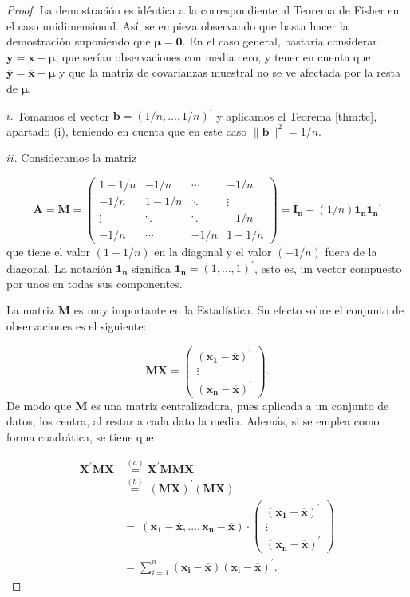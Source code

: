 \documentclass[
  a4paper,
  oneside]{scrbook}
\theoremstyle{definition}
\theoremstyle{definition}
\theoremstyle{definition}
\theoremstyle{definition}
\theoremstyle{remark}
\begin{document}
\begin{proof}
La demostración es idéntica a la correspondiente al Teorema de
Fisher en el caso unidimensional. Así, se empieza observando que basta
hacer la demostración suponiendo que \(\bm{\mu}=\bm{\bm{0}}\). En el caso
general, bastaría considerar \(\bm{y}=\bm{x}-\bm{\mu}\), que serían
observaciones con media cero, y tener en cuenta que
\(\overline{\bm{y}}=\overline{\bm{x}}-\bm{\mu}\) y que la matriz de
covarianzas muestral no se ve afectada por la resta de \(\bm{\mu}\).

\(i.\) Tomamos el vector \(\bm{b}=(1/n,\ldots,1/n)^\prime{}\) y aplicamos
el Teorema \ref{thm:tc}, apartado
(i), teniendo en cuenta que en este caso \(\|\bm{b}\|^2=1/n\).

\(ii.\) Consideramos la matriz

\[\bm{A}=\bm{M}=\left(\begin{array}{cccc}
1-1/n & -1/n & \cdots & -1/n \\
-1/n & 1-1/n & \ddots & \vdots \\
\vdots & \ddots & \ddots & -1/n \\
-1/n & \cdots & -1/n & 1-1/n
\end{array}\right)=\bm{I_n}-(1/n)\bm{1_n}\bm{1_n}^\prime{}\] que tiene
el valor \((1-1/n)\) en la diagonal y el valor \((-1/n)\) fuera de la
diagonal. La notación \(\bm{1_n}\) significa
\(\bm{1_n}=(1,\ldots,1)^\prime{}\), esto es, un vector compuesto por unos
en todas sus componentes.

La matriz \(\bm{M}\) es muy importante en la Estadística. Su efecto sobre
el conjunto de observaciones es el siguiente:

\[\bm{M}\bm{X}=\left(\begin{array}{c}
\left(\bm{x_1}-\overline{\bm{x}}\right)^{\prime} \\
\vdots \\
\left(\bm{x_n}-\overline{\bm{x}}\right)^{\prime}
\end{array}\right).\] De modo que \(\bm{M}\) es una matriz centralizadora,
pues aplicada a un conjunto de datos, los centra, al restar a cada dato
la media. Además, si se emplea como forma cuadrática, se tiene que

\[\begin{aligned}
\bm{X}^\prime{}\bm{M}\bm{X}&\stackrel{(a)}{=}\bm{X}^\prime{}\bm{M}\bm{M}\bm{X}\\
&\stackrel{(b)}{=}\ (\bm{M}\bm{X})^\prime{}(\bm{M}\bm{X})\\
&=\ \left(\bm{x_1}-\overline{\bm{x}},\ldots, \bm{x_n}-\overline{\bm{x}}\right)\cdot \left(\begin{array}{c}
\left(\bm{x_1}-\overline{\bm{x}}\right)^{\prime} \\
\vdots \\
\left(\bm{x_n}-\overline{\bm{x}}\right)^{\prime}
\end{array}\right)\\
&=\sum_{i=1}^n \left(\bm{x_i}-\overline{\bm{x}}\right)\left(\bm{x_i}-\overline{\bm{x}}\right)^{\prime}.
\end{aligned}\]


\end{proof}
\end{document}
